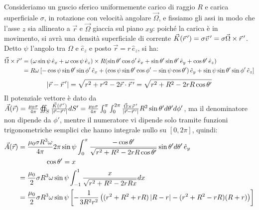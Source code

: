 \documentclass[]{article}
\begin{document}
Consideriamo un guscio sferico uniformemente carico di raggio $ R $ e carica superficiale $ \sigma $, in rotazione con velocità angolare $ \vec{\Omega} $, e fissiamo gli assi in modo che l'asse $ z $ sia allineato a $ \vec{r} $ e $ \vec{\Omega} $ giaccia sul piano $ xy $: poiché la carica è in movimento, si avrà una densità superficiale di corrente $ \vec{K}(\vec{r}\,') = \sigma\vec{v}\,' = \sigma\vec{\Omega}\times\vec{r}\,' $. \\ 
%
Detto $ \psi $ l'angolo tra $ \Omega $ e $ \hat{e}_z $ e posto $ \vec{r} = r\,\hat{e}_z $, si ha:
\begin{equation}
	\begin{split}
		\vec{\Omega}\times\vec{r}\,' &= (\omega \sin\psi \,\hat{e}_x + \omega \cos\psi \,\hat{e}_z) \times R (\sin\theta'\cos\phi' \,\hat{e}_x + \sin\theta'\sin\theta' \,\hat{e}_y + \cos\theta' \,\hat{e}_z) \\ 
				     &= R\omega \left[-\cos\psi\sin\theta'\sin\phi' \,\hat{e}_x + (\cos\psi\sin\theta'\cos\phi' - \sin\psi\cos\theta')\,\hat{e}_y + \sin\psi\sin\theta'\sin\phi' \,\hat{e}_z \right]
	\end{split}
	\label{eq:}
\end{equation}
\begin{equation}
	\left\lvert\vec{r} - \vec{r}\,'\right\rvert = \sqrt{r^2 + r'^2 - 2\vec{r}\cdot\vec{r}\,'} = \sqrt{r^2 + R^2 - 2rR\cos\theta'}
	\label{eq:}
\end{equation}
Il potenziale vettore è dato da $ \vec{A}(\vec{r}) = \frac{\mu_0 \sigma}{4\pi} \oiint_S \frac{\vec{K}(\vec{r}\,')}{\left\lvert\vec{r}-\vec{r}\,'\right\rvert} dS' = \frac{\mu_0 \sigma}{4\pi} \int_0^{\pi} \int_0^{2\pi} \frac{\vec{\Omega}\times\vec{r}\,'}{\left\lvert\vec{r}-\vec{r}\,'\right\rvert} R^2 \sin\theta' d\theta' d\phi' $, ma il denominatore non dipende da $ \phi' $, mentre il numeratore vi dipende solo tramite funzioni trigonometriche semplici che hanno integrale nullo su $ [0,2\pi] $, quindi:
\begin{equation}
	\begin{split}
		\vec{A}(\vec{r}) &= \displaystyle\frac{\mu_0 \sigma R^3 \omega}{4\pi} 2\pi\sin\psi \int_0^{\pi} \displaystyle\frac{-\cos\theta'}{\sqrt{r^2 + R^2 -2rR\cos\theta'}} \sin\theta' d\theta' \,\hat{e}_y \\ 
				 & \qquad\qquad \cos\theta' = x \\ 
				 &= \displaystyle\frac{\mu_0}{2} \sigma R^3 \omega \sin\psi \int_{-1}^{1} \displaystyle\frac{x}{\sqrt{r^2 + R^2 - 2rRx}} dx \\ 
				 &= \displaystyle\frac{\mu_0}{2} \sigma R^3 \omega \sin\psi \left[ -\displaystyle\frac{1}{3R^2r^2}\left( (r^2 + R^2 + rR)\left\lvert R - r\right\rvert - (r^2 + R^2 - rR)(R + r)\right)\right]
	\end{split}
	\label{eq:}
\end{equation}
\end{document}

